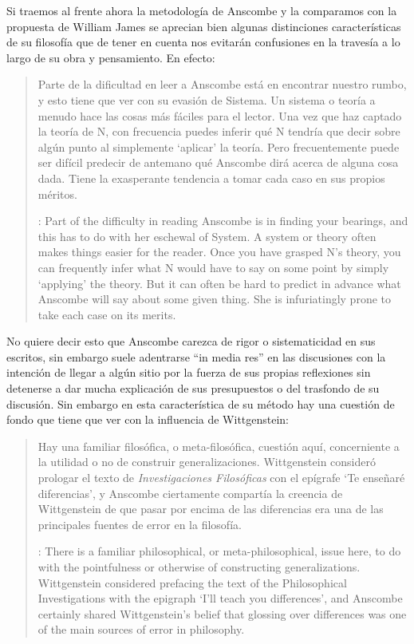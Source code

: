 Si traemos al frente ahora la metodología de Anscombe y la comparamos con la
propuesta de William James se aprecian bien algunas distinciones características
de su filosofía que de tener en cuenta nos evitarán confusiones en la travesía a
lo largo de su obra y pensamiento. En efecto:
\blockquote[{\cite[1]{teichmann2008ans}}: Part of the difficulty in reading
Anscombe is in finding your bearings, and this has to do with her eschewal of
System. A system or theory often makes things easier for the reader. Once you
have grasped N's theory, you can frequently infer what N would have to say on
some point by simply `applying' the theory. But it can often be hard to predict
in advance what Anscombe will say about some given thing. She is infuriatingly
prone to take each case on its merits.]{Parte de la dificultad en leer a
  Anscombe está en encontrar nuestro rumbo, y esto tiene que ver con su evasión
  de Sistema. Un sistema o teoría a menudo hace las cosas más fáciles para el
  lector. Una vez que haz captado la teoría de N, con frecuencia puedes inferir
  qué N tendría que decir sobre algún punto al simplemente \enquote*{aplicar} la
  teoría. Pero frecuentemente puede ser difícil predecir de antemano qué
  Anscombe dirá acerca de alguna cosa dada. Tiene la exasperante tendencia a
  tomar cada caso en sus propios méritos.}
No quiere decir esto que Anscombe carezca de rigor o sistematicidad en sus
escritos, sin embargo suele adentrarse \enquote{in media res} en las discusiones
con la intención de llegar a algún sitio por la fuerza de sus propias
reflexiones sin detenerse a dar mucha explicación de sus presupuestos o del
trasfondo de su discusión.\autocite[Cf.~][1]{teichmann2008ans} Sin embargo en
esta característica de su método hay una cuestión de fondo que tiene que ver con
la influencia de Wittgenstein:
\blockquote[{\cite[1]{teichmann2008ans}}: There is a familiar philosophical, or
meta-philosophical, issue here, to do with the pointfulness or otherwise of
constructing generalizations. Wittgenstein considered prefacing the text of the
Philosophical Investigations with the epigraph `I'll teach you differences', and
Anscombe certainly shared Wittgenstein's belief that glossing over differences
was one of the main sources of error in philosophy. ]{Hay una familiar
  filosófica, o meta-filosófica, cuestión aquí, concerniente a la utilidad o no
  de construir generalizaciones. Wittgenstein consideró prologar el texto de
  \emph{Investigaciones Filosóficas} con el epígrafe \enquote*{Te enseñaré
    diferencias}, y Anscombe ciertamente compartía la creencia de Wittgenstein
  de que pasar por encima de las diferencias era una de las principales fuentes
  de error en la filosofía.}

